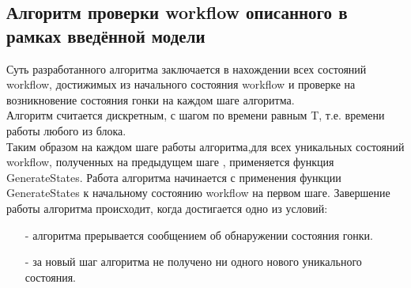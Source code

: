 \documentclass[a4paper,12pt]{article}
\begin{document}
\subsection{Алгоритм проверки workflow описанного в рамках введённой модели}
Суть разработанного алгоритма заключается в нахождении всех состояний workflow, достижимых из начального состояния workflow и проверке на возникновение состояния гонки на каждом шаге алгоритма.\\
Алгоритм считается дискретным, с шагом по времени равным T, т.е. времени работы любого из блока.\\
Таким образом на каждом шаге работы алгоритма,для всех уникальных состояний workflow, полученных на предыдущем шаге , применяется функция GenerateStates. 
Работа алгоритма начинается с применения функции GenerateStates к начальному состоянию workflow на первом шаге. Завершение работы алгоритма происходит, когда достигается одно из условий:
\begin{enumerate}
\item[-] алгоритма прерывается сообщением об обнаружении состояния гонки. 
\item[-] за новый шаг алгоритма не получено ни одного нового уникального состояния.
\end{enumerate}
  
\end{document}
